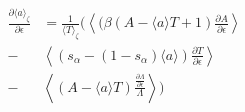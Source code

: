 \documentclass[twocolumn,aip,cha]{revtex4-1}
\begin{document}
\begin{eqnarray*}
&\frac{\partial \langle a\rangle_{\zeta}}{\partial \epsilon}& = \frac{1}{\langle T \rangle_{\zeta}}\Bigg( \left\langle (\beta(A-\langle a\rangle T + 1)\frac{\partial A}{\partial \epsilon}\right\rangle \\ &-& \left\langle (s_{\alpha}-(1-s_{\alpha})\langle a\rangle)\frac{\partial T}{\partial \epsilon}\right\rangle  \\
&-&\left\langle (A-\langle a \rangle T) \frac{\frac{\partial \Lambda}{\partial \epsilon}}{\Lambda}\right\rangle \Bigg)
\end{eqnarray*}

{}
\end{document}

